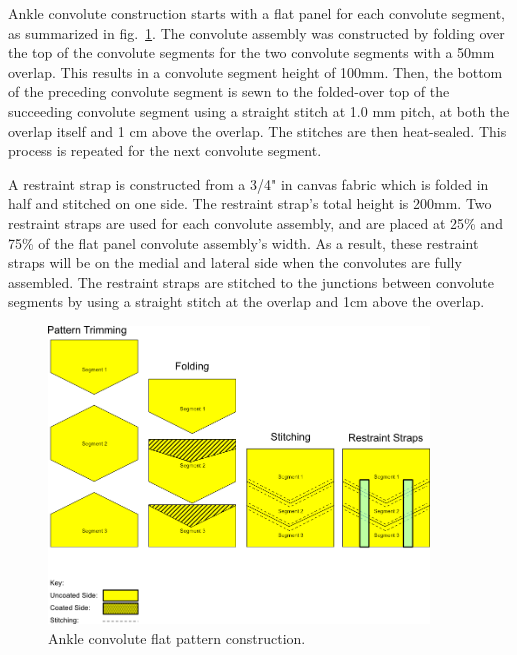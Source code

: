\documentclass[defaultstyle,11pt]{comps}
\begin{document}
Ankle convolute construction starts with a flat panel for each convolute segment, as summarized in fig.~\ref{fig:SA3-convoluteflat}.
The convolute assembly was constructed by folding over the top of the convolute segments for the two convolute segments with a 50mm overlap.
This results in a convolute segment height of 100mm.
Then, the bottom of the preceding convolute segment is sewn to the folded-over top of the succeeding convolute segment using a straight stitch at 1.0 mm pitch, at both the overlap itself and 1 cm above the overlap.
The stitches are then heat-sealed.
This process is repeated for the next convolute segment.

A restraint strap is constructed from a 3/4" in canvas fabric which is folded in half and stitched on one side.
The restraint strap's total height is 200mm.
Two restraint straps are used for each convolute assembly, and are placed at 25\% and 75\% of the flat panel convolute assembly's width.
As a result, these restraint straps will be on the medial and lateral side when the convolutes are fully assembled.
The restraint straps are stitched to the junctions between convolute segments by using a straight stitch at the overlap and 1cm above the overlap.

\begin{figure}
\hypertarget{fig:SA3-convoluteflat}{%
\centering
\includegraphics[width=0.9\textwidth,height=\textheight]{../fig/SA3/ConvoluteConstruction.png}
\caption{Ankle convolute flat pattern construction.}\label{fig:SA3-convoluteflat}
}
\end{figure}
\end{document}
